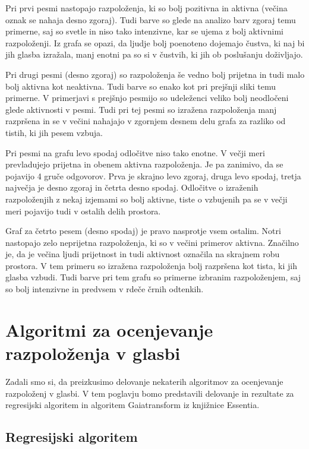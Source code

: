 \documentclass[a4paper, 12pt]{book}
\begin{document}
{Pri prvi pesmi nastopajo razpoloženja, ki so bolj pozitivna in aktivna (večina oznak se nahaja desno zgoraj). Tudi barve so glede na analizo barv zgoraj temu primerne, saj so svetle in niso tako intenzivne, kar se ujema z bolj aktivnimi razpoloženji. Iz grafa se opazi, da ljudje bolj poenoteno dojemajo čustva, ki naj bi jih glasba izražala, manj enotni pa so si v čustvih, ki jih ob poslušanju doživljajo. 

Pri drugi pesmi (desno zgoraj) so razpoloženja še vedno bolj prijetna in tudi malo bolj aktivna kot neaktivna. Tudi barve so enako kot pri prejšnji sliki temu primerne. V primerjavi s prejšnjo pesmijo so udeleženci veliko bolj neodločeni glede aktivnosti v pesmi. Tudi pri tej pesmi so izražena razpoloženja manj razpršena in se v večini nahajajo v zgornjem desnem delu grafa za razliko od tistih, ki jih pesem vzbuja. 

Pri pesmi na grafu levo spodaj odločitve niso tako enotne. V večji meri prevladujejo prijetna in obenem aktivna razpoloženja. Je pa zanimivo, da se pojavijo 4 gruče odgovorov. Prva je skrajno levo zgoraj, druga levo spodaj, tretja največja je desno zgoraj in četrta desno spodaj. Odločitve o izraženih razpoloženjih z nekaj izjemami so bolj aktivne, tiste o vzbujenih pa se v večji meri pojavijo tudi v ostalih delih prostora. 

Graf za četrto pesem (desno spodaj) je pravo nasprotje vsem ostalim. Notri nastopajo zelo neprijetna razpoloženja, ki so v večini primerov aktivna. Značilno je, da je večina ljudi prijetnost in tudi aktivnost označila na skrajnem robu prostora. V tem primeru so izražena razpoloženja bolj razpršena kot tista, ki jih glasba vzbudi. Tudi barve pri tem grafu so primerne izbranim razpoloženjem, saj so bolj intenzivne in predvsem v rdeče črnih odtenkih. 


\chapter{Algoritmi za ocenjevanje razpoloženja v glasbi}

Zadali smo si, da preizkusimo delovanje nekaterih algoritmov za ocenjevanje razpoloženj v glasbi. V tem poglavju bomo predstavili delovanje in rezultate za regresijski algoritem in algoritem Gaiatransform iz knjižnice Essentia.

\section{Regresijski algoritem}
\label{regresijsialg}

}
\end{document}
